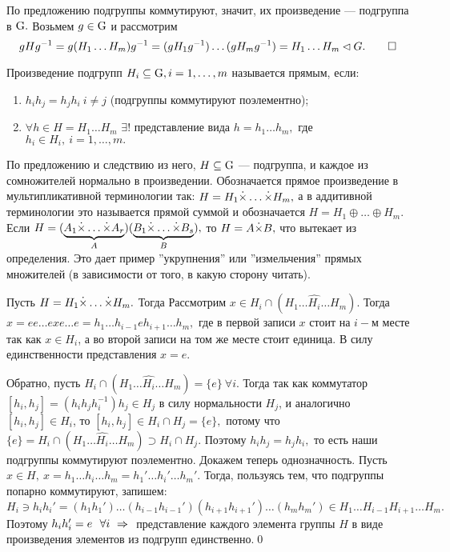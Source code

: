 
\dok По предложению подгруппы коммутируют, значит, их произведение --- подгруппа в $\rr G.$ Возьмем $g\in\rr G$ и рассмотрим
$$
gHg^{-1}=g(H_1\dots H_m)g^{-1}=(gH_1g^{-1})\dots(gH_mg^{-1})=H_1\dots H_m\lhd G.\mbox{\qquad\qed}
$$

\de Произведение подгрупп $H_i\subseteq \rr G, i=1,\dots,m$ называется прямым, если:
\begin{enumerate}
    \item $h_ih_j=h_jh_i\ i\ne j$ (подгруппы коммутируют поэлементно);
    \item $\forall h\in H=H_1\dots H_m$ $\exists !$ представление вида $h=h_1\dots h_m,$ где $h_i\in H_i,\ i=1,\dots,m.$
\end{enumerate}
По предложению и следствию из него, $H\subseteq\rr G$ --- подгруппа, и каждое из сомножителей нормально в произведении.
Обозначается прямое произведение в мультипликативной терминологии так: $H=H_1\dot{\times}\dots\pr H_m,$ а в аддитивной терминологии это называется прямой суммой и
обозначается $H=H_1\oplus\dots\oplus H_m.$ Если $H=(\underbrace{A_1\pr\dots\pr A_r}_A)(\underbrace{B_1\pr\dots\pr B_s}_B),$ то $H=A\pr B,$ что вытекает из определения.
Это дает пример ''укрупнения'' или ''измельчения'' прямых множителей (в зависимости от того, в какую сторону читать).


\dok Пусть $H=H_1\pr\dots\pr H_m.$ Тогда Рассмотрим $x\in H_i\cap(H_1\dots\widehat{H_i}\dots H_m).$ Тогда $x=ee\dots exe\dots e=h_1\dots h_{i-1}eh_{i+1}\dots h_m,$
где в первой записи $x$ стоит на $i-$м месте так как $x\in H_i$, а во второй записи на том же месте стоит единица. В силу единственности представления $x=e.$

Обратно, пусть $H_i\cap(H_1\dots\widehat{H_i}\dots H_m)=\{e\}\ \forall i.$ Тогда так как коммутатор $[h_i,h_j]=(h_ih_jh_i^{-1})h_j\in H_j$ в силу нормальности $H_j$, и аналогично $[h_i,h_j]\in H_i$,
то $[h_i,h_j]\in H_i\cap H_j=\{e\},$ потому что $\{e\}=H_i\cap(H_1\dots\widehat{H_i}\dots H_m)\supset H_i\cap H_j.$ Поэтому $h_ih_j=h_jh_i,$ то есть
наши подгруппы коммутируют поэлементно. Докажем теперь однозначность. Пусть $x\in H,\ x=h_1\dots h_i\dots h_m=h_1'\dots h_i'\dots h_m'.$
Тогда, пользуясь тем, что подгруппы попарно коммутируют, запишем: $$H_i\ni h_ih_i'=(h_1h_1')\dots(h_{i-1}h_{i-1}')(h_{i+1}h_{i+1}')\dots(h_mh_m')\in H_1\dots{H_{i-1}}{H_{i+1}}\dots H_m.$$
Поэтому $h_ih_i'=e\ \ \forall i\ra $ представление каждого элемента группы $H$ в виде произведения элементов из подгрупп единственно.\qquad\qed

